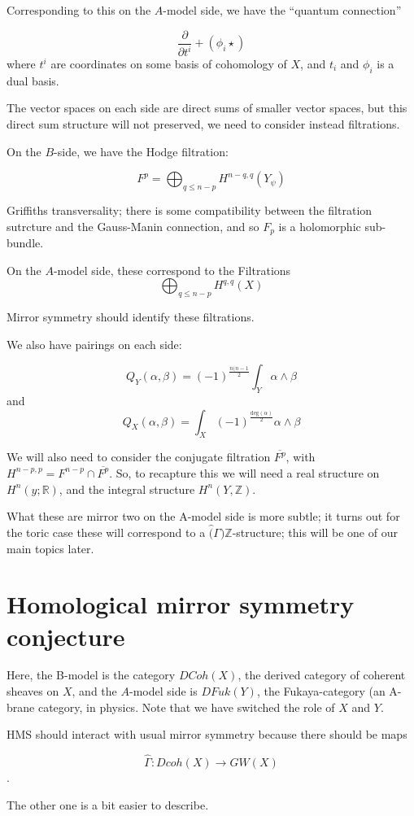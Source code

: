 \documentclass{amsart}
\theoremstyle{definition}
\newcommand{\Z}{\mathbb{Z}}
\newcommand{\R}{\mathbb{R}}
\begin{document}
Corresponding to this on the $A$-model side, we have the ``quantum connection''

$$\frac{\partial}{\partial t^i}+(\phi_i\star )$$
where $t^i$ are coordinates on some basis of cohomology of $X$, and $t_i$ and $\phi_i$ is a dual basis.

The vector spaces on each side are direct sums of smaller vector spaces, but this direct sum structure will not preserved, we need to consider instead filtrations.

On the $B$-side, we have the Hodge filtration:

$$F^p=\bigoplus_{q\leq n-p} H^{n-q,q}(Y_\psi)$$

Griffiths transversality; there is some compatibility between the filtration sutrcture and the Gauss-Manin connection, and so $F_p$ is a holomorphic sub-bundle.

On the $A$-model side, these correspond to the Filtrations
$$\bigoplus_{q\leq n-p} H^{q,q}(X)$$

Mirror symmetry should identify these filtrations.

We also have pairings on each side:

$$Q_Y(\alpha,\beta)=(-1)^{\frac{n(n-1}{2}}\int_Y\alpha\wedge\beta$$
and
$$Q_X(\alpha,\beta)=\int_X (-1)^{\frac{\text{deg}(\alpha)}{2}}\alpha\wedge\beta$$


We will also need to consider the conjugate filtration $\overline{F^p}$, with $H^{n-p,p}=F^{n-p}\cap \overline{F^p}$.  So, to recapture this we will need a real structure on $H^n(y;\R)$, and the integral structure $H^n(Y,\Z)$.  

What these are mirror two on the A-model side is more subtle; it turns out for the toric case these will correspond to a $\hat(\Gamma) \Z$-structure; this will be one of our main topics later.

\section{Homological mirror symmetry conjecture}
Here, the B-model is the category $DCoh(X)$, the derived category of coherent sheaves on $X$, and the $A$-model side is $DFuk(Y)$, the Fukaya-category (an A-brane category, in physics.  Note that we have switched the role of $X$ and $Y$.

HMS should interact with usual mirror symmetry because there should be maps

$$\hat{\Gamma}:Dcoh(X)\to GW(X)$$.

The other one is a bit easier to describe.
\end{document}
